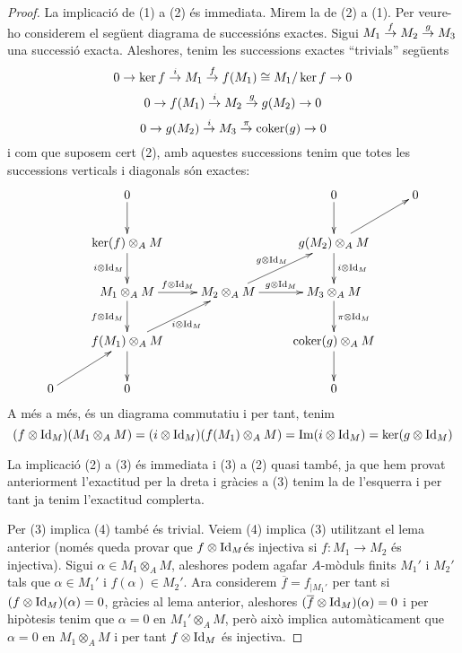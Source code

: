 \documentclass[../../../main.tex]{subfiles}
\begin{document}
\begin{proof}
La implicació de (1) a (2) és immediata. Mirem la de (2) a (1). Per veure-ho considerem el següent diagrama de successións exactes. Sigui $M_1\overset{f}{\to}M_2\overset{g}{\to}M_3$ una successió exacta. Aleshores, tenim les successions exactes ``trivials'' següents
\begin{equation}
    \notag
    0\to\ker f\overset{i}{\to}M_1\overset{f}{\to}f(M_1)\cong M_1/\ker f\to 0
\end{equation}
\begin{equation}
    \notag
    0\to f(M_1)\overset{i}{\to}M_2\overset{g}{\to}g(M_2)\to 0
\end{equation}
\begin{equation}
    \notag
    0\to g(M_2)\overset{i}{\to}M_3\overset{\pi}{\to}\mathrm{coker}(g)\to 0
\end{equation}
i com que suposem cert (2), amb aquestes successions tenim que totes les successions verticals i diagonals són exactes:
\begin{equation}
    \notag
    \xymatrix{
    & 0\ar[d] & & 0\ar[d]& 0 \\
    & \ker(f)\otimes_AM\ar[d]_{i\otimes\id_M} & & g(M_2)\otimes_AM\ar[d]^{i\otimes\id_M}\ar[ur] &  \\
     & M_1\otimes_AM\ar[d]_{f\otimes\id_M}\ar[r]^{f\otimes\id_M} & M_2\otimes_AM\ar[ur]^{g\otimes\id_M}\ar[r]^{g\otimes\id_M} & M_3\otimes_AM\ar[d]^{\pi\otimes\id_M} & \\
      & f(M_1)\otimes_AM\ar[d]\ar[ur]_{i\otimes\id_M} & & \mathrm{coker}(g)\otimes_AM\ar[d] & \\
      0\ar[ur] & 0 & & 0 & 
    }
\end{equation}
A més a més, és un diagrama commutatiu i per tant, tenim
\begin{equation}
    \notag
    (f\otimes\operatorname{Id}_M)(M_1\otimes_AM) = (i\otimes\operatorname{Id}_M)(f(M_1)\otimes_AM)=\operatorname{Im}(i\otimes\operatorname{Id}_M) = \ker(g\otimes\operatorname{Id}_M)
\end{equation}

La implicació (2) a (3) és immediata i (3) a (2) quasi també, ja que hem provat anteriorment l'exactitud per la dreta i gràcies a (3) tenim la de l'esquerra i per tant ja tenim l'exactitud complerta. 

Per (3) implica (4) també és trivial. Veiem (4) implica (3) utilitzant el lema anterior (només queda provar que $f\otimes\operatorname{Id}_M$és injectiva si $f:M_1\to M_2$ és injectiva). Sigui $\alpha\in M_1\otimes_AM$, aleshores podem agafar $A$-mòduls finits $M_1'$ i $M_2'$ tals que $\alpha\in M_1'$ i $f(\alpha)\in M_2'$. Ara considerem $\overline{f} = f_{|M_1'}$ per tant si $(f\otimes\operatorname{Id}_M)(\alpha) = 0$, gràcies al lema anterior, aleshores $(\overline{f}\otimes\operatorname{Id}_M)(\alpha) = 0$ i per hipòtesis tenim que $\alpha = 0$ en $M_1'\otimes_AM$, però això implica automàticament que $\alpha = 0$ en $M_1\otimes_AM$ i per tant $f\otimes\operatorname{Id}_M$ és injectiva.
\end{proof}
\end{document}
